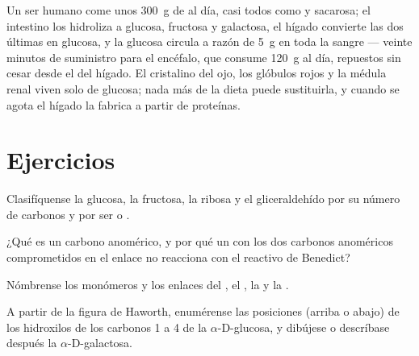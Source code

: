 \begin{example}\label{ex:b1:carbohydrates:day}
Un ser humano come unos \qty{300}{g} de  al día, casi todos como
 y sacarosa; el intestino los hidroliza a glucosa, fructosa y
galactosa, el hígado convierte las dos últimas en glucosa, y la glucosa
circula a razón de \qty{5}{g} en toda la sangre --- veinte minutos de
suministro para el encéfalo, que consume \qty{120}{g} al día, repuestos sin
cesar desde el  del hígado. El cristalino del ojo, los glóbulos
rojos y la médula renal viven solo de glucosa; nada más de la dieta puede
sustituirla, y cuando se agota el hígado la fabrica a partir de proteínas.
\end{example}

\section{Ejercicios}

\begin{exercise}[$\star$]\label{exo:b1:carbohydrates:1}
Clasifíquense la glucosa, la fructosa, la ribosa y el gliceraldehído por su
número de carbonos y por ser  o .
\end{exercise}

\begin{exercise}[$\star$]\label{exo:b1:carbohydrates:2}
¿Qué es un carbono anomérico, y por qué un  con los dos carbonos
anoméricos comprometidos en el enlace no reacciona con el reactivo de
Benedict?
\end{exercise}

\begin{exercise}[$\star$]\label{exo:b1:carbohydrates:3}
Nómbrense los monómeros y los enlaces del , el , la 
y la .
\end{exercise}

\begin{exercise}[$\star$]\label{exo:b1:carbohydrates:4}
A partir de la figura de Haworth, enumérense las posiciones (arriba o abajo)
de los hidroxilos de los carbonos 1 a 4 de la $\alpha$-D-glucosa, y dibújese
o descríbase después la $\alpha$-D-galactosa.
\end{exercise}

